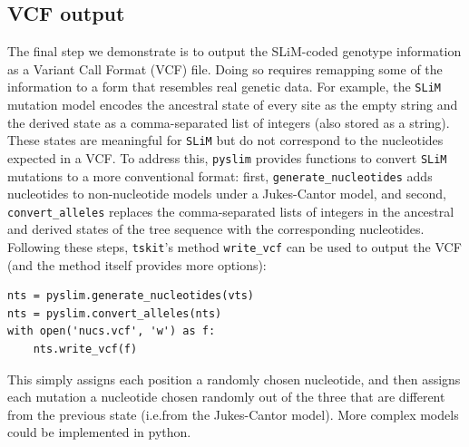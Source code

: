 \documentclass[12pt]{article}
\newcommand{\tskit}[0]{\texttt{tskit}\xspace}
\newcommand{\slim}[0]{\texttt{SLiM}\xspace}
\newcommand{\pyslim}[0]{\texttt{pyslim}\xspace}
\newcommand*{\ie}{i.e.\xcomma}
\begin{document}
\subsection*{VCF output}
The final step we demonstrate is to output the SLiM-coded genotype information as a Variant Call Format (VCF) file.
Doing so requires remapping some of the information to a form that resembles real genetic data.
For example, the \slim mutation model encodes the ancestral state of every site as the empty string and the derived state
as a comma-separated list of integers (also stored as a string).
These states are meaningful for \slim but do not correspond to the nucleotides expected in a VCF.
To address this, \pyslim provides functions to convert \slim mutations to a more conventional format:
first, \verb|generate_nucleotides| adds nucleotides to non-nucleotide models under a Jukes-Cantor model,
and second, \verb|convert_alleles| replaces the comma-separated lists of integers in the ancestral and derived states of the tree sequence
with the corresponding nucleotides.
Following these steps, \tskit's method \verb|write_vcf| can be used to output the VCF
(and the method itself provides more options):
\begin{verbatim}
nts = pyslim.generate_nucleotides(vts)
nts = pyslim.convert_alleles(nts)
with open('nucs.vcf', 'w') as f:
    nts.write_vcf(f)
\end{verbatim}
This simply assigns each position a randomly chosen nucleotide,
and then assigns each mutation a nucleotide chosen randomly out of the three that are different
from the previous state (\ie from the Jukes-Cantor model).
More complex models could be implemented in python.

\end{document}
